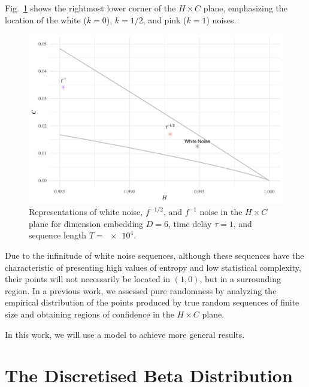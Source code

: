\documentclass[12pt]{article}
\begin{document}
Fig.~\ref{fig:RightMostCorner} shows the rightmost lower corner of the $H\times C$ plane, emphasizing the location of the white ($k=0$), $k=1/2$, and pink ($k=1$) noises.

\begin{figure}[hbt]
	\centering
	\includegraphics[width=\linewidth]{RightMostCorner}
	\caption{Representations of white noise, $f^{-1/2}$, and $f^{-1}$ noise in the $H \times C$ plane  for dimension embedding $D = 6$, time delay $\tau = 1$, and sequence length $T = \num[scientific-notation=true]{e4}$.}
	\label{fig:RightMostCorner}
\end{figure}

Due to the infinitude of white noise sequences, although these sequences have the characteristic of presenting high values of entropy and low statistical complexity, their points will not necessarily be located in $(1, 0)$, but in a surrounding region.
In a previous work, we assessed pure randomness by analyzing the empirical distribution of the points produced by true random sequences of finite size and obtaining regions of confidence in the $H \times C$ plane.

In this work, we will use a model to achieve more general results.

\section{The Discretised Beta Distribution}
\end{document}
